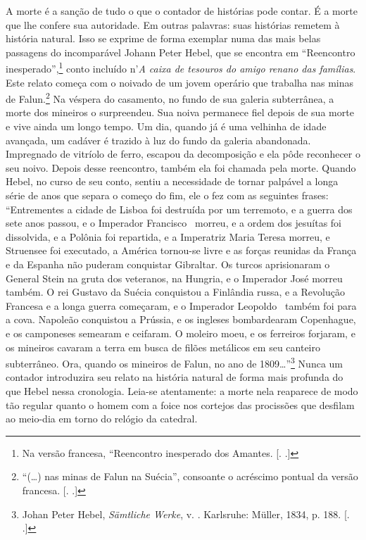 A morte é a sanção de tudo o que o contador de histórias pode contar. É
a morte que lhe confere sua autoridade. Em outras palavras: suas
histórias remetem à história natural. Isso se exprime de forma exemplar
numa das mais belas passagens do incomparável Johann Peter Hebel, que se
encontra em ``Reencontro inesperado'',\footnote{Na versão francesa,
  ``Reencontro inesperado dos Amantes. [. .]} conto
incluído n'\emph{A caixa de tesouros do amigo renano das famílias}. Este
relato começa com o noivado de um jovem operário que trabalha nas minas
de Falun.\footnote{``(\ldots{}) nas minas de Falun na Suécia'', consoante o
  acréscimo pontual da versão francesa. [. .]} Na véspera do
casamento, no fundo de sua galeria subterrânea, a morte dos mineiros o
surpreendeu. Sua noiva permanece fiel depois de sua morte e vive ainda
um longo tempo. Um dia, quando já é uma velhinha de idade avançada, um
cadáver é trazido à luz do fundo da galeria abandonada. Impregnado de
vitríolo de ferro, escapou da decomposição e ela pôde reconhecer o seu
noivo. Depois desse reencontro, também ela foi chamada pela morte.
Quando Hebel, no curso de seu conto, sentiu a necessidade de tornar
palpável a longa série de anos que separa o começo do fim, ele o fez com
as seguintes frases: ``Entrementes a cidade de Lisboa foi destruída por
um terremoto, e a guerra dos sete anos passou, e o Imperador Francisco~
morreu, e a ordem dos jesuítas foi dissolvida, e a Polônia foi
repartida, e a Imperatriz Maria Teresa morreu, e Struensee foi
executado, a América tornou-se livre e as forças reunidas da França e da
Espanha não puderam conquistar Gibraltar. Os turcos aprisionaram o
General Stein na gruta dos veteranos, na Hungria, e o Imperador José
morreu também. O rei Gustavo da Suécia conquistou a Finlândia russa, e a
Revolução Francesa e a longa guerra começaram, e o Imperador Leopoldo~
também foi para a cova. Napoleão conquistou a Prússia, e os ingleses
bombardearam Copenhague, e os camponeses semearam e ceifaram. O moleiro
moeu, e os ferreiros forjaram, e os mineiros cavaram a terra em busca de
filões metálicos em seu canteiro subterrâneo. Ora, quando os mineiros de
Falun, no ano de 1809\ldots{}''\footnote{Johan Peter Hebel, \emph{Sämtliche
  Werke}, v. . Karlsruhe: Müller, 1834, p. 188. [. .]}
Nunca um contador introduzira seu relato na história natural de forma
mais profunda do que Hebel nessa cronologia. Leia-se atentamente: a
morte nela reaparece de modo tão regular quanto o homem com a foice nos
cortejos das procissões que desfilam ao meio-dia em torno do relógio da
catedral.

